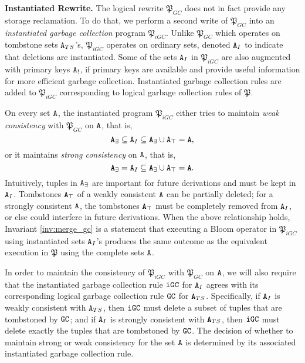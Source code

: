 \textbf{Instantiated Rewrite.}
The logical rewrite $\mathfrak{P}_{GC}$ does not in fact provide any storage reclamation.
To do that, we perform a second write of $\mathfrak{P}_{GC}$ into an \emph{instantiated garbage collection} program $\mathfrak{P}_{iGC}$.
Unlike $\mathfrak{P}_{GC}$ which operates on tombstone sets $\tt{A}_{TS}$'s, $\mathfrak{P}_{iGC}$ operates on ordinary sets, denoted $\tt{A}_I$ to indicate that deletions are instantiated.
Some of the sets $\tt{A}_I$ in $\mathfrak{P}_{iGC}$ are also augmented with primary keys $\tt{A}_!$, if primary keys are available and provide useful information for more efficient garbage collection.
Instantiated garbage collection rules are added to $\mathfrak{P}_{iGC}$ corresponding to logical garbage collection rules of $\mathfrak{P}$.

On every set $\tt{A}$, the instantiated program $\mathfrak{P}_{iGC}$ either tries to maintain \emph{weak consistency} with $\mathfrak{P}_{GC}$ on $\tt{A}$, that is,
\[ \tt{A}_\exists \subseteq \tt{A}_I \subseteq \tt{A}_\exists \cup \tt{A}_\top = \tt{A},\]
or it maintains \emph{strong consistency} on $\tt{A}$, that is,
\[ \tt{A}_\exists = \tt{A}_I \subseteq \tt{A}_\exists \cup \tt{A}_\top = \tt{A}.\]
Intuitively, tuples in $\tt{A}_\exists$ are important for future derivations and must be kept in $\tt{A}_I$.
Tombstones $\tt{A}_\top$ of a weakly consistent $\tt{A}$ can be partially deleted; for a strongly consistent $\tt{A}$, the tombstones $\tt{A}_\top$ must be completely removed from $\tt{A}_I$, or else could interfere in future derivations.
When the above relationship holds, Invariant \ref{inv:merge_gc} is a statement that executing a Bloom operator in $\mathfrak{P}_{iGC}$ using instantiated sets $\tt{A}_I$'s produces the same outcome as the equivalent execution in $\mathfrak{P}$ using the complete sets $\tt{A}$.

In order to maintain the consistency of $\mathfrak{P}_{iGC}$ with $\mathfrak{P}_{GC}$ on $\tt{A}$, we will also require that the instantiated garbage collection rule $\tt{iGC}$ for $\tt{A}_I$ agrees with its corresponding logical garbage collection rule $\tt{GC}$ for $\tt{A}_{TS}$.
Specifically, if $\tt{A}_I$ is weakly consistent with $\tt{A}_{TS}$, then $\tt{iGC}$ must delete a subset of tuples that are tombstoned by $\tt{GC}$; and if $\tt{A}_I$ is strongly consistent with $\tt{A}_{TS}$, then $\tt{iGC}$ must delete exactly the tuples that are tombstoned by $\tt{GC}$.
The decision of whether to maintain strong or weak consistency for the set $\tt{A}$ is determined by its associated instantiated garbage collection rule.

